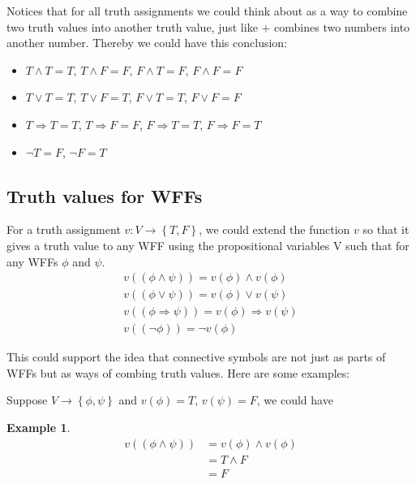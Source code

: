 \documentclass[11pt]{article}
\theoremstyle{definition}
\newtheorem{eg}{Example}
\begin{document}
Notices that for all truth assignments we could think about as a way to combine two truth values into another truth value, just like $+$ combines two numbers into another number. Thereby we could have this conclusion:
\begin{itemize}
    \item $T \wedge T = T$, $T \wedge F = F$, $F \wedge T = F$, $F \wedge F = F$
    \item $T \vee T = T$, $T \vee F = T$, $F \vee T = T$, $F \vee F = F$
    \item $T \Rightarrow T = T$, $T \Rightarrow F = F$, $F \Rightarrow T = T$, $F \Rightarrow F = T$
    \item $\neg T = F$, $\neg F = T$
\end{itemize}

\subsection{Truth values for WFFs}
For a truth assignment $v: V \rightarrow \left\{T,F\right\}$, we could extend the function $v$ so that it gives a truth value to any WFF using the propositional variables V such that for any WFFs $\phi$ and $\psi$.
\begin{gather}
    v((\phi \wedge \psi)) = v(\phi) \wedge v(\phi)\\
    v((\phi \vee \psi)) = v(\phi) \vee v(\psi)\\
    v((\phi \Rightarrow \psi)) = v(\phi) \Rightarrow v(\psi)\\
    v((\neg \phi)) = \neg v(\phi)
\end{gather}

This could support the idea that connective symbols are not just as parts of WFFs but as ways of combing truth values. Here are some examples:

Suppose $V \rightarrow \left\{\phi,\psi\right\}$ and $v(\phi)=T$, $v(\psi)=F$, we could have
\begin{eg}
    \begin{equation}
        \begin{split}
            v((\phi \wedge \psi)) &= v(\phi) \wedge v(\phi)\\
                                  &= T \wedge F\\
                                  &= F
        \end{split}
    \end{equation}
\end{eg}
\end{document}
